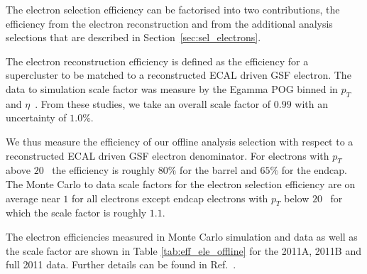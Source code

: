 
The electron selection efficiency can be factorised into two contributions,
the efficiency from the electron reconstruction and from the additional
analysis selections that are described in Section~\ref{sec:sel_electrons}.

The electron reconstruction efficiency is defined as the efficiency for a
supercluster to be matched to a reconstructed ECAL driven GSF electron.
The data to simulation scale factor was measure by the Egamma POG binned in
$p_T$ and $\eta$~\cite{ref:egamma_eff_gsf}. From these studies, we take an overall scale factor of
$0.99$ with an uncertainty of $1.0\%$.

We thus measure the efficiency of our offline analysis selection 
with respect to a reconstructed ECAL driven GSF electron denominator. 
For electrons with $p_{T}$ 
above $20$ \GeV\, the efficiency is roughly $80\%$ for the barrel and 
$65\%$ for the endcap.
The Monte Carlo to data scale factors for the electron selection efficiency are
on average near $1$ for all electrons except endcap electrons with $p_{T}$ 
below $20$ \GeV\ for which the scale factor is roughly $1.1$. 

The electron efficiencies measured in Monte Carlo simulation and data as well as the scale
factor are shown in Table \ref{tab:eff_ele_offline} for the 2011A, 2011B and full 2011 data.
Further details can be found in Ref.~\cite{HWW2011Final}.

